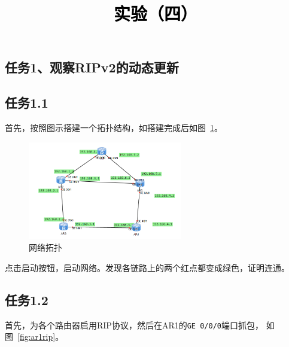 \documentclass[a4paper,twoside]{article}
\newcommand{\PaperTitle}{实验（四）}  %
\begin{document}
\newpage

\title{
	\Large{\textcolor{black}{\PaperTitle}}
}
	
	
\maketitle
	
\tableofcontents
 
\newpage
\setcounter{page}{1}

\begin{spacing}{1.2}

\section{任务1、观察RIPv2的动态更新}

\subsection{任务1.1}

首先，按照图示搭建一个拓扑结构，如搭建完成后如图~\ref{fig:riptopo}。
\begin{figure}[htb]
	\centering
	\caption{网络拓扑}
	\label{fig:riptopo}
	\includegraphics[width=0.6\textwidth]{topo.png}
\end{figure}

点击启动按钮，启动网络。发现各链路上的两个红点都变成绿色，证明连通。

\subsection{任务1.2}

首先，为各个路由器启用RIP协议，然后在AR1的\texttt{GE 0/0/0}端口抓包，
如图~\ref{fig:ar1rip}。


\end{spacing}
\end{document}
